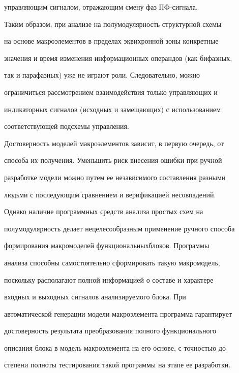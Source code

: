 управляющим сигналом, отражающим смену фаз ПФ-сиг\-нала.





   Таким образом, при анализе на полумодулярность структурной схемы


на основе макроэлементов в пределах эквихронной зоны конкретные


значения и время изменения информационных операндов (как бифазных,


так и парафазных) уже не играют роли. Следовательно, можно


ограничиться рассмотрением взаимодействия только управляющих и


индикаторных сигналов (исходных и замещающих) с использованием


соответствующей подсхемы управления.








   Достоверность моделей макроэлементов зависит, в первую очередь, от


способа их получения. Уменьшить риск внесения ошибки при ручной


разработке модели можно путем ее независимого составления разными


людьми с последующим сравнением и верификацией несовпадений.





   Однако наличие программных средств анализа простых схем на


полумодулярность делает нецелесообразным применение ручного способа


формирования макромоделей функциональных\linebreak блоков. Программы


анализа способны самостоятельно сформировать такую макромодель,


поскольку располагают полной информацией о составе и характере


входных и выходных сигналов анализируемого блока. При


автоматической генерации модели макроэлемента программа гарантирует


достоверность результата преобразования полного функционального


описания блока в модель макроэлемента на его основе, с точностью до


степени полноты тестирования такой программы на этапе ее раз\-ра\-ботки.








